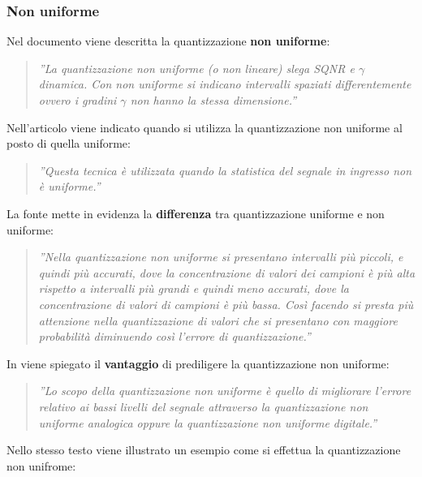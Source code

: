 \documentclass[a4paper]{report} %
\begin{document}
\subsubsection{Non uniforme}
Nel documento \cite{art:rif.18} viene descritta la quantizzazione \textbf{non uniforme}:
\begin{quote}
	\textit{''La quantizzazione non uniforme (o non lineare) slega SQNR e $\gamma$ dinamica. Con non uniforme si indicano intervalli spaziati differentemente ovvero i gradini $\gamma$ non hanno la stessa dimensione.''}
\end{quote}
Nell'articolo \cite{art:rif.7} viene indicato quando si utilizza la quantizzazione non uniforme al posto di quella uniforme:
\begin{quote}
	\textit{''Questa tecnica è utilizzata quando la statistica del segnale in ingresso non è uniforme.''}
\end{quote}
La fonte \cite{art:rif.6} mette in evidenza la \textbf{differenza} tra quantizzazione uniforme e non uniforme:
\begin{quote}
	\textit{''Nella quantizzazione non uniforme si presentano intervalli più piccoli, e quindi più accurati, dove la concentrazione di valori dei campioni è più alta rispetto a intervalli più grandi e quindi meno accurati, dove la concentrazione di valori di campioni è più bassa. Così facendo si presta più attenzione nella quantizzazione di valori che si presentano con maggiore probabilità diminuendo così l'errore di quantizzazione.''} 
\end{quote}
In \cite{art:rif.8} viene spiegato il \textbf{vantaggio} di prediligere la quantizzazione non uniforme:
\begin{quote}
	\textit{''Lo scopo della quantizzazione non uniforme è quello di migliorare l'errore relativo ai bassi livelli del segnale attraverso la quantizzazione non uniforme analogica oppure la quantizzazione non uniforme digitale.''}
\end{quote}
Nello stesso testo viene illustrato un esempio come si effettua la quantizzazione non unifrome:
\end{document}

